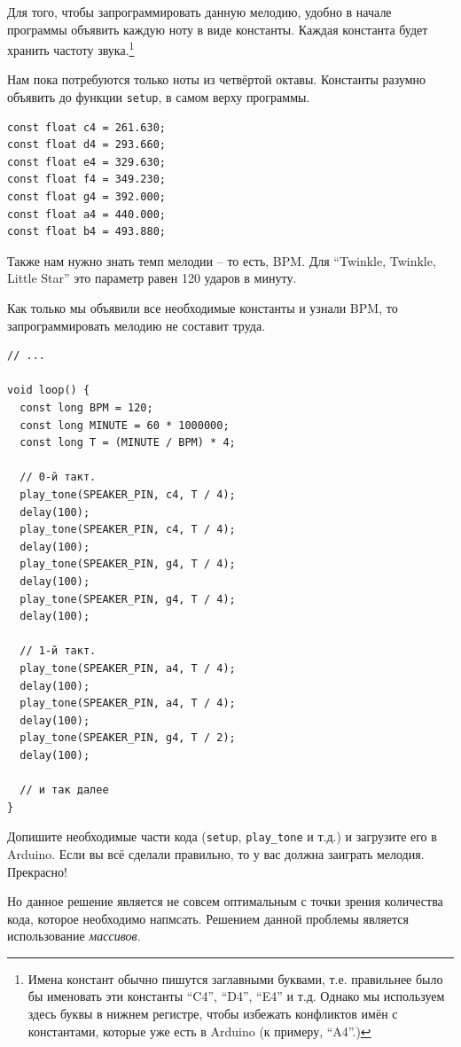 \documentclass[a4paper,twoside]{book}
\begin{document}
Для того, чтобы запрограммировать данную мелодию, удобно в начале программы
объявить каждую ноту в виде константы. Каждая константа будет хранить частоту
звука.\footnote{Имена констант обычно пишутся заглавными буквами, т.е.
правильнее было бы именовать эти константы ``C4'', ``D4'', ``E4'' и т.д. Однако мы
используем здесь буквы в нижнем регистре, чтобы избежать конфликтов имён с
константами, которые уже есть в Arduino (к примеру, ``A4''.)}

Нам пока потребуются только ноты из четвёртой октавы. Константы разумно объявить
до функции \texttt{setup}, в самом верху программы.

\begin{verbatim}
const float c4 = 261.630;
const float d4 = 293.660;
const float e4 = 329.630;
const float f4 = 349.230;
const float g4 = 392.000;
const float a4 = 440.000;
const float b4 = 493.880;
\end{verbatim}

Также нам нужно знать темп мелодии -- то есть, BPM. Для ``Twinkle, Twinkle,
Little Star'' это параметр равен 120 ударов в минуту.

Как только мы объявили все необходимые константы и узнали BPM, то
запрограммировать мелодию не составит труда.

\begin{verbatim}
// ...

void loop() {
  const long BPM = 120;
  const long MINUTE = 60 * 1000000;
  const long T = (MINUTE / BPM) * 4;

  // 0-й такт.
  play_tone(SPEAKER_PIN, c4, T / 4);
  delay(100);
  play_tone(SPEAKER_PIN, c4, T / 4);
  delay(100);
  play_tone(SPEAKER_PIN, g4, T / 4);
  delay(100);
  play_tone(SPEAKER_PIN, g4, T / 4);
  delay(100);

  // 1-й такт.
  play_tone(SPEAKER_PIN, a4, T / 4);
  delay(100);
  play_tone(SPEAKER_PIN, a4, T / 4);
  delay(100);
  play_tone(SPEAKER_PIN, g4, T / 2);
  delay(100);

  // и так далее
}
\end{verbatim}

Допишите необходимые части кода (\texttt{setup}, \texttt{play\_tone} и т.д.) и
загрузите его в Arduino. Если вы всё сделали правильно, то у вас должна заиграть
мелодия. Прекрасно!

Но данное решение является не совсем оптимальным с точки зрения количества кода,
которое необходимо напмсать. Решением данной проблемы является использование
\emph{массивов}.

\end{document}
